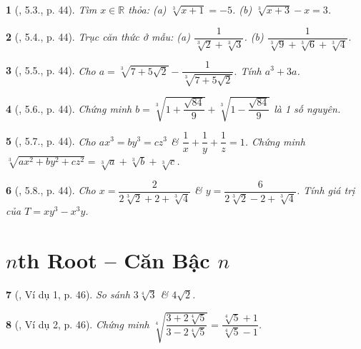 \documentclass{article}
\newtheorem{baitoan}{}%
\begin{document}
\begin{baitoan}[\cite{Binh_boi_duong_Toan_9_tap_1}, 5.3., p. 44]
	Tìm $x\in\mathbb{R}$ thỏa: (a) $\sqrt[3]{x + 1} = -5$. (b) $\sqrt[3]{x + 3} - x = 3$.
\end{baitoan}

\begin{baitoan}[\cite{Binh_boi_duong_Toan_9_tap_1}, 5.4., p. 44]
	Trục căn thức ở mẫu: (a) $\dfrac{1}{\sqrt[3]{2} + \sqrt[3]{3}}$. (b) $\dfrac{1}{\sqrt[3]{9} + \sqrt[3]{6} + \sqrt[3]{4}}$.
\end{baitoan}

\begin{baitoan}[\cite{Binh_boi_duong_Toan_9_tap_1}, 5.5., p. 44]
	Cho $a = \sqrt[3]{7 + 5\sqrt{2}} - \dfrac{1}{\sqrt[3]{7 + 5\sqrt{2}}}$. Tính $a^3 + 3a$.
\end{baitoan}

\begin{baitoan}[\cite{Binh_boi_duong_Toan_9_tap_1}, 5.6., p. 44]
	Chứng minh $b = \sqrt[3]{1 + \dfrac{\sqrt{84}}{9}} + \sqrt[3]{1 - \dfrac{\sqrt{84}}{9}}$ là 1 số nguyên.
\end{baitoan}

\begin{baitoan}[\cite{Binh_boi_duong_Toan_9_tap_1}, 5.7., p. 44]
	Cho $ax^3 = by^3 = cz^3$ \& $\dfrac{1}{x} + \dfrac{1}{y} + \dfrac{1}{z} = 1$. Chứng minh $\sqrt[3]{ax^2 + by^2 + cz^2} = \sqrt[3]{a} + \sqrt[3]{b} + \sqrt[3]{c}$.
\end{baitoan}

\begin{baitoan}[\cite{Binh_boi_duong_Toan_9_tap_1}, 5.8., p. 44]
	Cho $x = \dfrac{2}{2\sqrt[3]{2} + 2 + \sqrt[3]{4}}$ \& $y = \dfrac{6}{2\sqrt[3]{2} - 2 + \sqrt[3]{4}}$. Tính giá trị của $T = xy^3 - x^3y$.
\end{baitoan}


\section{$n$th Root -- Căn Bậc $n$}

\begin{baitoan}[\cite{Binh_boi_duong_Toan_9_tap_1}, Ví dụ 1, p. 46]
	So sánh $3\sqrt[4]{3}$ \& $4\sqrt{2}$.
\end{baitoan}

\begin{baitoan}[\cite{Binh_boi_duong_Toan_9_tap_1}, Ví dụ 2, p. 46]
	Chứng minh $\sqrt[4]{\dfrac{3 + 2\sqrt[4]{5}}{3 - 2\sqrt[4]{5}}} = \dfrac{\sqrt[4]{5} + 1}{\sqrt[4]{5} - 1}$.
\end{baitoan}
\end{document}
